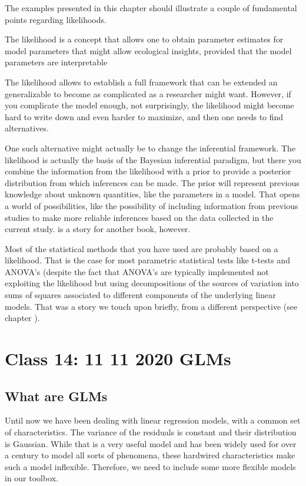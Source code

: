\documentclass[
]{book}
\begin{document}
The examples presented in this chapter should illustrate a couple of fundamental points regarding likelihoods.

The likelihood is a concept that allows one to obtain parameter estimates for model parameters that might allow ecological insights, provided that the model parameters are interpretable

The likelihood allows to establish a full framework that can be extended an generalizable to become as complicated as a researcher might want. However, if you complicate the model enough, not surprisingly, the likelihood might become hard to write down and even harder to maximize, and then one needs to find alternatives.

One such alternative might actually be to change the inferential framework. The likelihood is actually the basis of the Bayesian inferential paradigm, but there you combine the information from the likelihood with a prior to provide a posterior distribution from which inferences can be made. The prior will represent previous knowledge about unknown quantities, like the parameters in a model. That opens a world of possibilities, like the possibility of including information from previous studies to make more reliable inferences based on the data collected in the current study. is a story for another book, however.

Most of the statistical methods that you have used are probably based on a likelihood. That is the case for most parametric statistical tests like t-tests and ANOVA's (despite the fact that ANOVA's are typically implemented not exploiting the likelihood but using decompositions of the sources of variation into sums of squares associated to different components of the underlying linear models. That was a story we touch upon briefly, from a different perspective (see chapter ).

\hypertarget{aula14}{%
\chapter{Class 14: 11 11 2020 GLMs}\label{aula14}}

\hypertarget{what-are-glms}{%
\section{What are GLMs}\label{what-are-glms}}

Until now we have been dealing with linear regression models, with a common set of characteristics. The variance of the residuals is constant and their distribution is Gaussian. While that is a very useful model and has been widely used for over a century to model all sorts of phenomena, these hardwired characteristics make such a model inflexible. Therefore, we need to include some more flexible models in our toolbox.
\end{document}
